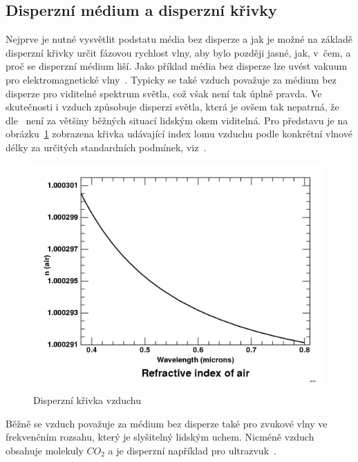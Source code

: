 \subsection{Disperzní médium a disperzní křivky}
Nejprve je nutné vysvětlit podstatu média bez
disperze a jak je možné na základě disperzní křivky
určit fázovou rychlost vlny, aby bylo později jasné,
jak, v~čem, a proč se disperzní médium liší.
Jako příklad média bez disperze lze uvést vakuum
pro elektromagnetické vlny~\cite{wiki_disp_rel}.
Typicky se také vzduch považuje za médium bez
disperze pro viditelné spektrum světla, což
však není tak úplně pravda. Ve skutečnosti i
vzduch způsobuje disperzi světla, která je ovšem
tak nepatrná, že dle~\cite{air_dispersive} není
za většiny běžných situací lidským okem viditelná.
Pro představu je na obrázku~\ref{fig:air_disp}
zobrazena křivka udávající index lomu vzduchu
podle konkrétní vlnové délky za určitých standardních
podmínek, viz~\cite{air_dispersive}.
\begin{figure}[htbp]
    \centering
    \includegraphics[scale=0.4]{img/disp_air.png}
    \caption{Disperzní křivka vzduchu}
    \label{fig:air_disp}
\end{figure}
Běžně se vzduch považuje za médium bez disperze
také pro zvukové vlny ve frekvenčním rozsahu,
který je slyšitelný lidským uchem. Nicméně vzduch
obsahuje molekuly $CO_2$ a je disperzní například
pro ultrazvuk~\cite{sound_dispersion}.

